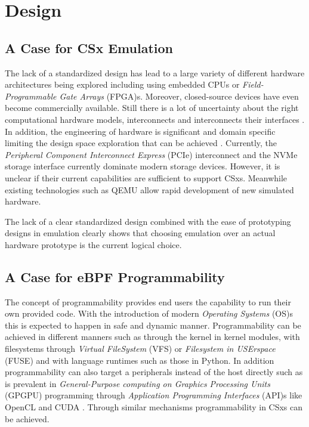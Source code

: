 
\chapter{Design} %

\section{A Case for CSx Emulation}

\label{emulatecase}

The lack of a standardized design has lead to a large variety of different
hardware architectures being explored including using embedded CPUs or
\textit{Field-Programmable Gate Arrays} (FPGA)s. Moreover, closed-source
devices have even become commercially available. Still there is a lot of
uncertainty about the right computational hardware models, interconnects and
interconnects their interfaces \cite{barbalacecomputational}. In addition,
the engineering of hardware is significant and domain specific limiting the 
design space exploration that can be achieved \cite{10.1145/3439839.3459085}.
Currently, the \textit{Peripheral Component Interconnect Express} (PCIe)
interconnect and the NVMe storage interface currently dominate modern storage
devices. However, it is unclear if their current capabilities are sufficient to
support CSxs. Meanwhile existing technologies such as QEMU allow rapid
development of new simulated hardware.

The lack of a clear standardized design combined with the ease of prototyping
designs in emulation clearly shows that choosing emulation over an actual
hardware prototype is the current logical choice.

\section{A Case for eBPF Programmability}

\label{ebpfcase}

The concept of programmability provides end users the capability to run their
own provided code. With the introduction of modern \textit{Operating Systems}
(OS)s this is expected to happen in safe and dynamic manner. Programmability
can be achieved in different manners such as through the kernel in kernel
modules, with filesystems through \textit{Virtual FileSystem} (VFS) \cite{vfs}
or \textit{Filesystem in USErspace} (FUSE) \cite{fuse} and with language
runtimes such as those in Python. In addition programmability can also target a
peripherals instead of the host directly such as is prevalent in
\textit{General-Purpose computing on Graphics Processing Units} (GPGPU)
programming through \textit{Application Programming Interfaces} (API)s like
OpenCL \cite{opencl} and CUDA \cite{cuda}. Through similar mechanisms
programmability in CSxs can be achieved.


